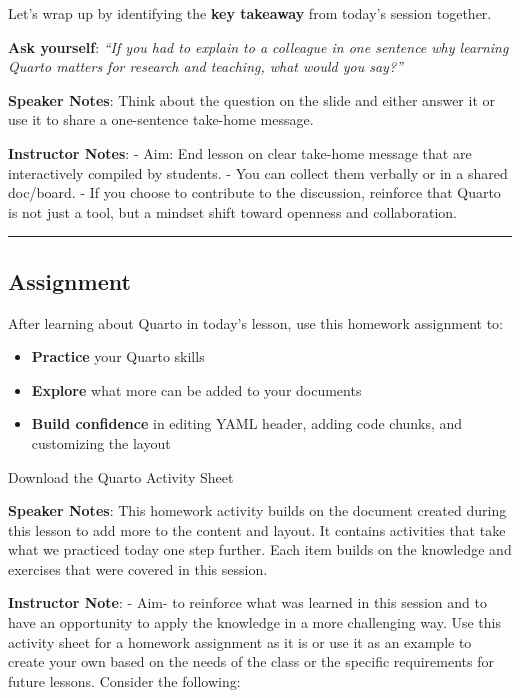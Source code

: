 \documentclass[
  letterpaper,
  DIV=11,
  numbers=noendperiod]{scrartcl}
\providecommand{\tightlist}{%
  \setlength{\itemsep}{0pt}\setlength{\parskip}{0pt}}
\begin{document}
Let's wrap up by identifying the \textbf{key takeaway} from today's
session together.

\textbf{Ask yourself}: \emph{``If you had to explain to a colleague in
one sentence why learning Quarto matters for research and teaching, what
would you say?''}

\textbf{Speaker Notes}: Think about the question on the slide and either
answer it or use it to share a one-sentence take-home message.

\textbf{Instructor Notes}: - Aim: End lesson on clear take-home message
that are interactively compiled by students. - You can collect them
verbally or in a shared doc/board. - If you choose to contribute to the
discussion, reinforce that Quarto is not just a tool, but a mindset
shift toward openness and collaboration.

\begin{center}\rule{0.5\linewidth}{0.5pt}\end{center}

\subsection{Assignment}\label{assignment}

After learning about Quarto in today's lesson, use this homework
assignment to:

\begin{itemize}
\tightlist
\item
  \textbf{Practice} your Quarto skills
\item
  \textbf{Explore} what more can be added to your documents
\item
  \textbf{Build confidence} in editing YAML header, adding code chunks,
  and customizing the layout
\end{itemize}

Download the Quarto Activity Sheet

\textbf{Speaker Notes}: This homework activity builds on the document
created during this lesson to add more to the content and layout. It
contains activities that take what we practiced today one step further.
Each item builds on the knowledge and exercises that were covered in
this session.

\textbf{Instructor Note}: - Aim- to reinforce what was learned in this
session and to have an opportunity to apply the knowledge in a more
challenging way. Use this activity sheet for a homework assignment as it
is or use it as an example to create your own based on the needs of the
class or the specific requirements for future lessons. Consider the
following:
\end{document}
